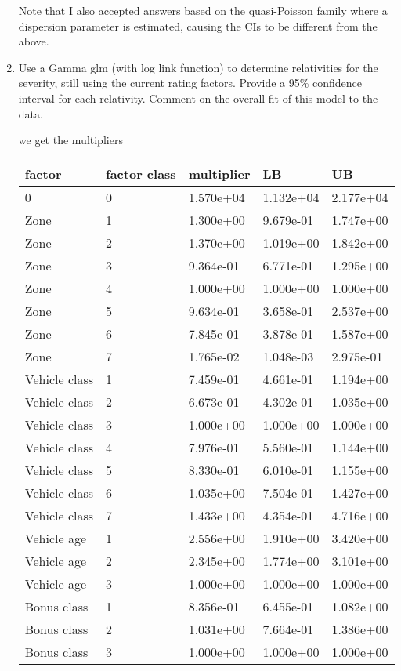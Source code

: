 \documentclass[11pt]{article}
\begin{document}
\begin{enumerate}
Note that I also accepted answers based on the quasi-Poisson family where a dispersion parameter is estimated, causing the CIs to be different from the above.

\newpage
\item Use a Gamma glm (with log link function) to determine relativities for the severity, still using the current rating factors.
Provide a 95\% confidence interval for each relativity. Comment on the overall fit of this model to the data.

 we get the multipliers

\begin{tabular}{lllll}
\hline
factor & factor class & multiplier & LB & UB\\
\hline
0&0&1.570e+04&1.132e+04&2.177e+04\\
Zone&1&1.300e+00&9.679e-01&1.747e+00\\
Zone&2&1.370e+00&1.019e+00&1.842e+00\\
Zone&3&9.364e-01&6.771e-01&1.295e+00\\
Zone&4&1.000e+00&1.000e+00&1.000e+00\\
Zone&5&9.634e-01&3.658e-01&2.537e+00\\
Zone&6&7.845e-01&3.878e-01&1.587e+00\\
Zone&7&1.765e-02&1.048e-03&2.975e-01\\
Vehicle class&1&7.459e-01&4.661e-01&1.194e+00\\
Vehicle class&2&6.673e-01&4.302e-01&1.035e+00\\
Vehicle class&3&1.000e+00&1.000e+00&1.000e+00\\
Vehicle class&4&7.976e-01&5.560e-01&1.144e+00\\
Vehicle class&5&8.330e-01&6.010e-01&1.155e+00\\
Vehicle class&6&1.035e+00&7.504e-01&1.427e+00\\
Vehicle class&7&1.433e+00&4.354e-01&4.716e+00\\
Vehicle age&1&2.556e+00&1.910e+00&3.420e+00\\
Vehicle age&2&2.345e+00&1.774e+00&3.101e+00\\
Vehicle age&3&1.000e+00&1.000e+00&1.000e+00\\
Bonus class&1&8.356e-01&6.455e-01&1.082e+00\\
Bonus class&2&1.031e+00&7.664e-01&1.386e+00\\
Bonus class&3&1.000e+00&1.000e+00&1.000e+00\\
\hline
\end{tabular}


\end{enumerate}
\end{document}
